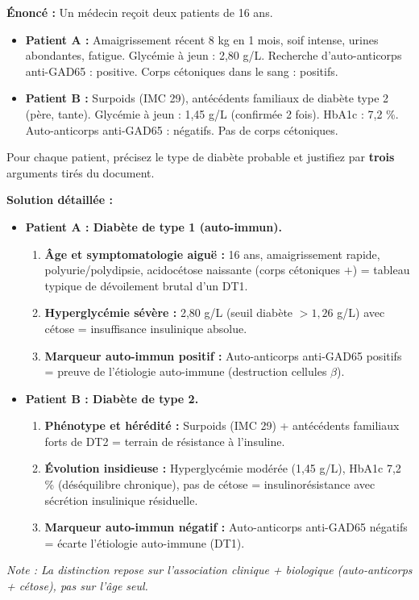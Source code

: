 \documentclass[11pt]{article}
\begin{document}
\begin{exoresolu}
\textbf{Énoncé :} Un médecin reçoit deux patients de 16 ans.
\begin{itemize}
    \item \textbf{Patient A :} Amaigrissement récent 8 kg en 1 mois, soif intense, urines abondantes, fatigue. Glycémie à jeun : 2,80 g/L. Recherche d'auto-anticorps anti-GAD65 : positive. Corps cétoniques dans le sang : positifs.
    \item \textbf{Patient B :} Surpoids (IMC 29), antécédents familiaux de diabète type 2 (père, tante). Glycémie à jeun : 1,45 g/L (confirmée 2 fois). HbA1c : 7,2 \%. Auto-anticorps anti-GAD65 : négatifs. Pas de corps cétoniques.
\end{itemize}
Pour chaque patient, précisez le type de diabète probable et justifiez par \textbf{trois} arguments tirés du document.

\textbf{Solution détaillée :}
\begin{itemize}
    \item \textbf{Patient A : Diabète de type 1 (auto-immun).}
    \begin{enumerate}
        \item \textbf{Âge et symptomatologie aiguë :} 16 ans, amaigrissement rapide, polyurie/polydipsie, acidocétose naissante (corps cétoniques $+$) = tableau typique de dévoilement brutal d'un DT1.
        \item \textbf{Hyperglycémie sévère :} 2,80 g/L (seuil diabète $> 1,26$ g/L) avec cétose = insuffisance insulinique absolue.
        \item \textbf{Marqueur auto-immun positif :} Auto-anticorps anti-GAD65 positifs = preuve de l'étiologie auto-immune (destruction cellules $\beta$).
    \end{enumerate}
    \item \textbf{Patient B : Diabète de type 2.}
    \begin{enumerate}
        \item \textbf{Phénotype et hérédité :} Surpoids (IMC 29) + antécédents familiaux forts de DT2 = terrain de résistance à l'insuline.
        \item \textbf{Évolution insidieuse :} Hyperglycémie modérée (1,45 g/L), HbA1c 7,2 \% (déséquilibre chronique), pas de cétose = insulinorésistance avec sécrétion insulinique résiduelle.
        \item \textbf{Marqueur auto-immun négatif :} Auto-anticorps anti-GAD65 négatifs = écarte l'étiologie auto-immune (DT1).
    \end{enumerate}
\end{itemize}
\emph{Note : La distinction repose sur l'association clinique + biologique (auto-anticorps + cétose), pas sur l'âge seul.}
\end{exoresolu}
\end{document}
